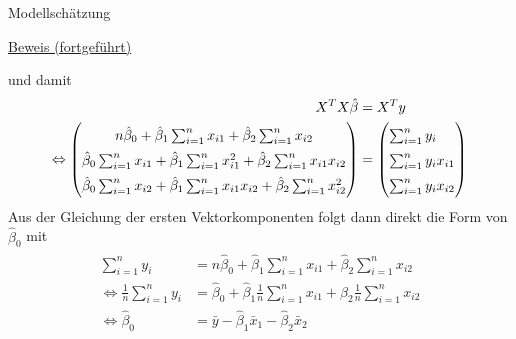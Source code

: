 \documentclass[
  8pt,
  ignorenonframetext,
]{beamer}
\begin{document}
\begin{frame}{Modellschätzung}
\protect\hypertarget{modellschuxe4tzung-5}{}
\footnotesize

\underline{Beweis (fortgeführt)}

und damit \tiny \begin{align*}
\renewcommand{\arraystretch}{1.5}
\begin{split}
X^TX\hat{\beta}
& =
X^Ty
\\\Leftrightarrow
\begin{pmatrix*}
n\hat{\beta}_0 + \hat{\beta}_1\sum_{i=1}^n x_{i1} + \hat{\beta}_2\sum_{i=1}^n x_{i2} \\
\hat{\beta}_0 \sum_{i=1}^n x_{i1} +  \hat{\beta}_1 \sum_{i=1}^n x_{i1}^2 + \hat{\beta}_2 \sum_{i=1}^n x_{i1}x_{i2} \\
\hat{\beta}_0 \sum_{i=1}^n x_{i2} +  \hat{\beta}_1 \sum_{i=1}^n x_{i1}x_{i2} + \hat{\beta}_2 \sum_{i=1}^n x_{i2}^2
\end{pmatrix*}
& =
\begin{pmatrix*}[l]
\sum_{i=1}^n y_i \\
\sum_{i=1}^n y_ix_{i1} \\
\sum_{i=1}^n y_ix_{i2} \\
\end{pmatrix*}
\end{split}
\end{align*} \footnotesize Aus der Gleichung der ersten
Vektorkomponenten folgt dann direkt die Form von \(\hat{\beta}_0\) mit
\tiny \begin{align}
\begin{split}
\sum_{i=1}^n y_i
& = n\hat{\beta}_0 + \hat{\beta}_1\sum_{i=1}^n x_{i1}            + \hat{\beta}_2\sum_{i=1}^n x_{i2}
\\\Leftrightarrow
\frac{1}{n}\sum_{i=1}^n y_i
& = \hat{\beta}_0  + \hat{\beta}_1\frac{1}{n}\sum_{i=1}^n x_{i1} + \hat{\beta}_2\frac{1}{n}\sum_{i=1}^n x_{i2}
\\\Leftrightarrow
\hat{\beta}_0
& = \bar{y} - \hat{\beta}_1\bar{x}_1 - \hat{\beta}_2\bar{x}_2
\end{split}
\end{align}
\end{frame}
\end{document}
